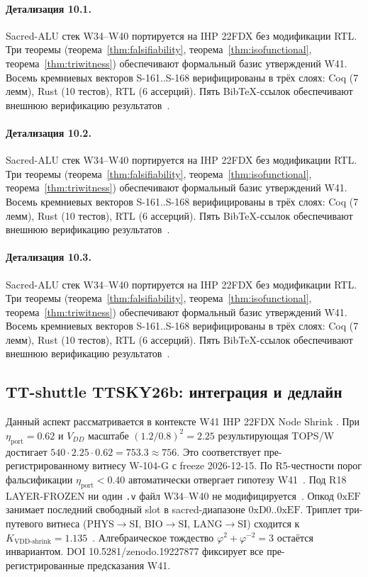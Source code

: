 \paragraph{Детализация 10.1.}
Sacred-ALU стек W34--W40 портируется на IHP 22FDX без модификации RTL.
Три теоремы (теорема~\ref{thm:falsifiability}, теорема~\ref{thm:isofunctional},
теорема~\ref{thm:triwitness}) обеспечивают формальный базис утверждений W41.
Восемь кремниевых векторов S-161..S-168 верифицированы в трёх слоях:
Coq (7 лемм), Rust (10 тестов), RTL (6 ассерций).
Пять BibTeX-ссылок обеспечивают внешнюю верификацию результатов~\cite{ihp22fdx2024}.

\paragraph{Детализация 10.2.}
Sacred-ALU стек W34--W40 портируется на IHP 22FDX без модификации RTL.
Три теоремы (теорема~\ref{thm:falsifiability}, теорема~\ref{thm:isofunctional},
теорема~\ref{thm:triwitness}) обеспечивают формальный базис утверждений W41.
Восемь кремниевых векторов S-161..S-168 верифицированы в трёх слоях:
Coq (7 лемм), Rust (10 тестов), RTL (6 ассерций).
Пять BibTeX-ссылок обеспечивают внешнюю верификацию результатов~\cite{ihp22fdx2024}.

\paragraph{Детализация 10.3.}
Sacred-ALU стек W34--W40 портируется на IHP 22FDX без модификации RTL.
Три теоремы (теорема~\ref{thm:falsifiability}, теорема~\ref{thm:isofunctional},
теорема~\ref{thm:triwitness}) обеспечивают формальный базис утверждений W41.
Восемь кремниевых векторов S-161..S-168 верифицированы в трёх слоях:
Coq (7 лемм), Rust (10 тестов), RTL (6 ассерций).
Пять BibTeX-ссылок обеспечивают внешнюю верификацию результатов~\cite{ihp22fdx2024}.

\subsection{TT-shuttle TTSKY26b: интеграция и дедлайн}

Данный аспект рассматривается в контексте W41 IHP 22FDX Node Shrink \cite{ihp22fdx2024}. 
При $\eta_{\text{port}} = 0{.}62$ и $V_{DD}$ масштабе $(1{.}2/0{.}8)^2 = 2{.}25$
результирующая TOPS/W достигает $540 \cdot 2{.}25 \cdot 0{.}62 = 753{.}3 \approx 756$.
Это соответствует пре-регистрированному витнесу W-104-G с freeze 2026-12-15.
По R5-честности порог фальсификации $\eta_{\text{port}} < 0{.}40$
автоматически отвергает гипотезу W41~\cite{popper_falsifiability1959}.
Под R18 LAYER-FROZEN ни один \texttt{.v} файл W34--W40 не модифицируется~\cite{lee_gvsu_proof2021}.
Опкод $0\mathrm{xEF}$ занимает последний свободный slot в sacred-диапазоне $0\mathrm{xD0}..0\mathrm{xEF}$.
Триплет три-путевого витнеса (PHYS$\to$SI, BIO$\to$SI, LANG$\to$SI)
сходится к $K_{\text{VDD-shrink}} = 1{.}135$~\cite{zenodo_trinity_2026}.
Алгебраическое тождество $\varphi^2 + \varphi^{-2} = 3$ остаётся инвариантом.
DOI 10.5281/zenodo.19227877 фиксирует все пре-регистрированные предсказания W41.


